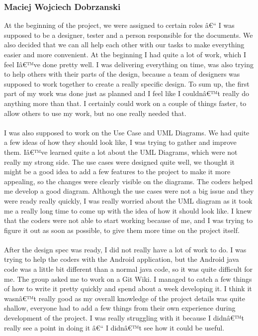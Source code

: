 \documentclass[12pt]{article}
\begin{document}
\subsubsection{Maciej Wojciech Dobrzanski}
At the beginning of the project, we were assigned to certain roles â€“ I was supposed to be a designer, tester and a person responsible for the documents. We also decided that we can all help each other with our tasks to make everything easier and more convenient. At the beginning I had quite a lot of work, which I feel Iâ€™ve done pretty well. I was delivering everything on time, was also trying to help others with their parts of the design, because a team of designers was supposed to work together to create a really specific design. To sum up, the first part of my work was done just as planned and I feel like I couldnâ€™t really do anything more than that. I certainly could work on a couple of things faster, to allow others to use my work, but no one really needed that. 
~\\\\
 I was also supposed to work on the Use Case and UML Diagrams. We had quite a few ideas of how they should look like, I was trying to gather and improve them. Iâ€™ve learned quite a lot about the UML Diagrams, which were not really my strong side. The use cases were designed quite well, we thought it might be a good idea to add a few features to the project to make it more appealing, so the changes were clearly visible on the diagrams. The coders helped me develop a good diagram. Although the use cases were not a big issue and they were ready really quickly, I was really worried about the UML diagram as it took me a really long time to come up with the idea of how it should look like. I knew that the coders were not able to start working because of me, and I was trying to figure it out as soon as possible, to give them more time on the project itself. 
~\\\\
After the design spec was ready, I did not really have a lot of work to do. I was trying to help the coders with the Android application, but the Android java code was a little bit different than a normal java code, so it was quite difficult for me. The group asked me to work on a Git Wiki. I managed to catch a few things of how to write it pretty quickly and spend about a week developing it. I think it wasnâ€™t really good as my overall knowledge of the project details was quite shallow, everyone had to add a few things from their own experience during development of the project. I was really struggling with it because I didnâ€™t really see a point in doing it â€“ I didnâ€™t see how it could be useful.
\end{document}
